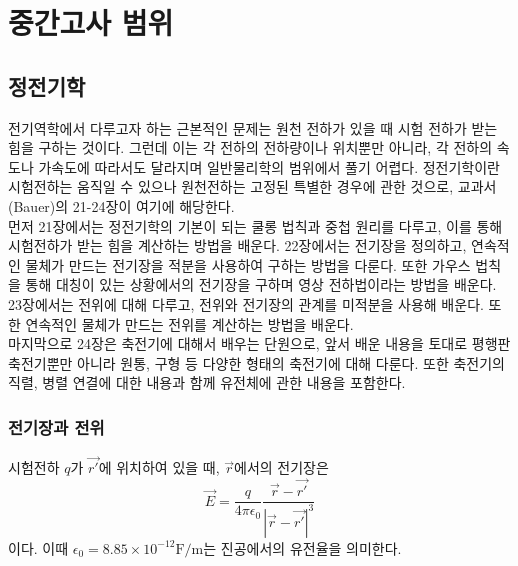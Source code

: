 
\part{중간고사 범위}



\chapter{정전기학}
전기역학에서 다루고자 하는 근본적인 문제는 원천 전하가 있을 때 시험 전하가 받는 힘을 구하는 것이다. 그런데 이는 각 전하의 전하량이나 위치뿐만 아니라, 각 전하의 속도나 가속도에 따라서도 달라지며 일반물리학의 범위에서 풀기 어렵다. 정전기학이란 시험전하는 움직일 수 있으나 원천전하는 고정된 특별한 경우에 관한 것으로, 교과서(Bauer)의 21-24장이 여기에 해당한다.\\
먼저 21장에서는 정전기학의 기본이 되는 쿨롱 법칙과 중첩 원리를 다루고, 이를 통해 시험전하가 받는 힘을 계산하는 방법을 배운다. 22장에서는 전기장을 정의하고, 연속적인 물체가 만드는 전기장을 적분을 사용하여 구하는 방법을 다룬다. 또한 가우스 법칙을 통해 대칭이 있는 상황에서의 전기장을 구하며 영상 전하법이라는 방법을 배운다.\\
23장에서는 전위에 대해 다루고, 전위와 전기장의 관계를 미적분을 사용해 배운다. 또한 연속적인 물체가 만드는 전위를 계산하는 방법을 배운다. \\
마지막으로 24장은 축전기에 대해서 배우는 단원으로, 앞서 배운 내용을 토대로 평행판 축전기뿐만 아니라 원통, 구형 등 다양한 형태의 축전기에 대해 다룬다. 또한 축전기의 직렬, 병렬 연결에 대한 내용과 함께 유전체에 관한 내용을 포함한다.\\

\section{전기장과 전위}
\begin{theorem}[쿨롱 법칙]
시험전하 $q$가 $\vec{r'}$에 위치하여 있을 때, $\vec{r}$에서의 전기장은
\begin{equation}
\vec{E}=\frac{q}{4\pi\epsilon_0}\frac{\vec{r}-\vec{r'}}{|\vec{r}-\vec{r'}|^3}
\end{equation}
이다. 이때 $\epsilon_0=8.85\times10^{-12}\mathrm{F/m}$는 진공에서의 유전율을 의미한다.
\end{theorem}

